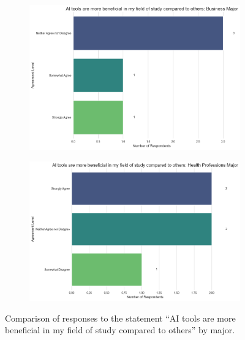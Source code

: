 \documentclass[12pt]{article}
\begin{document}
\begin{figure}[htbp]
\begin{subfigure}[b]{0.45\textwidth}
    \includegraphics[width=\textwidth]{fig10-3.png} %
    \label{fig:subfig1b}
  \end{subfigure}
  \hfill %
  \begin{subfigure}[b]{0.45\textwidth}
    \includegraphics[width=\textwidth]{fig10-4.png} %
    \label{fig:subfig1b}
  \end{subfigure}
  \caption{\centering Comparison of responses to the statement “AI tools are more beneficial in my field of study compared to others” by major.}
  \label{fig:subfigures1}
\end{figure}

\end{document}
